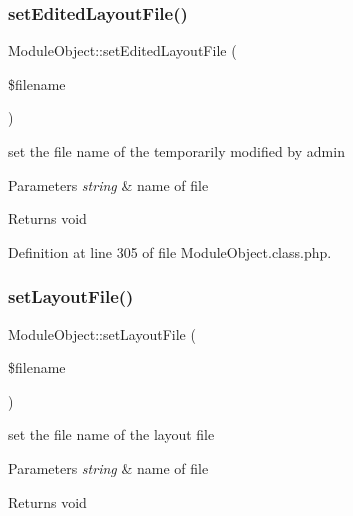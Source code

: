 \hypertarget{classModuleObject_a28e95b299aeac82b450e6ed8b121ff05}{}\label{classModuleObject_a28e95b299aeac82b450e6ed8b121ff05} 
\subsubsection{\texorpdfstring{set\+Edited\+Layout\+File()}{setEditedLayoutFile()}}
{\footnotesize\ttfamily Module\+Object\+::set\+Edited\+Layout\+File (\begin{DoxyParamCaption}\item[{}]{\$filename }\end{DoxyParamCaption})}

set the file name of the temporarily modified by admin 
\begin{DoxyParams}{Parameters}
{\em string} & name of file \\
\hline
\end{DoxyParams}
\begin{DoxyReturn}{Returns}
void 
\end{DoxyReturn}


Definition at line 305 of file Module\+Object.\+class.\+php.

\hypertarget{classModuleObject_aab99465b1bac81df148c829a3b14f933}{}\label{classModuleObject_aab99465b1bac81df148c829a3b14f933} 
\subsubsection{\texorpdfstring{set\+Layout\+File()}{setLayoutFile()}}
{\footnotesize\ttfamily Module\+Object\+::set\+Layout\+File (\begin{DoxyParamCaption}\item[{}]{\$filename }\end{DoxyParamCaption})}

set the file name of the layout file 
\begin{DoxyParams}{Parameters}
{\em string} & name of file \\
\hline
\end{DoxyParams}
\begin{DoxyReturn}{Returns}
void 
\end{DoxyReturn}



